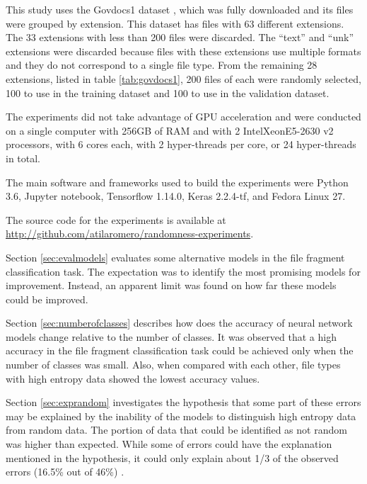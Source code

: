 This study uses the Govdocs1 dataset \cite{garfinkel_bringing_2009}, which was fully downloaded and its files were grouped by extension. This dataset has files with 63 different extensions. The 33 extensions with less than 200 files were discarded. The  ``text'' and ``unk'' extensions were discarded because files with these extensions use multiple formats and they do not correspond to a single file type. From the remaining 28 extensions, listed in table \ref{tab:govdocs1}, 200 files of each were randomly selected, 100 to use in the training dataset and 100 to use in the validation dataset.



The experiments did not take advantage of GPU acceleration and were  conducted on a single computer with 256GB of RAM and with 2 Intel\textregistered Xeon\textregistered E5-2630 v2 processors, with 6 cores each, with 2 hyper-threads per core, or 24 hyper-threads in total. 


The main software and frameworks used to build the experiments were Python 3.6, Jupyter notebook, Tensorflow 1.14.0, Keras 2.2.4-tf, and Fedora Linux 27.

The source code for the experiments is available at \sloppy\url{http://github.com/atilaromero/randomness-experiments}.

Section \ref{sec:evalmodels} evaluates some alternative models in the file fragment classification task. The expectation was to identify the most promising models for improvement. Instead, an apparent limit was found on how far these models could be improved. 

Section \ref{sec:numberofclasses} describes how does the accuracy of neural network models change relative to the number of classes. It was observed that a high accuracy in the file fragment classification task could be achieved only when the number of classes was small. Also, when compared with each other, file types with high entropy data showed the lowest accuracy values.

Section \ref{sec:exprandom} investigates the hypothesis that some part of these errors may be explained by the inability of the models to distinguish high entropy data from random data. The portion of data that could be identified as not random was higher than expected. While some of errors could have the explanation mentioned in the hypothesis, it could only explain about 1/3 of the observed errors (16.5\% out of 46\%) .








